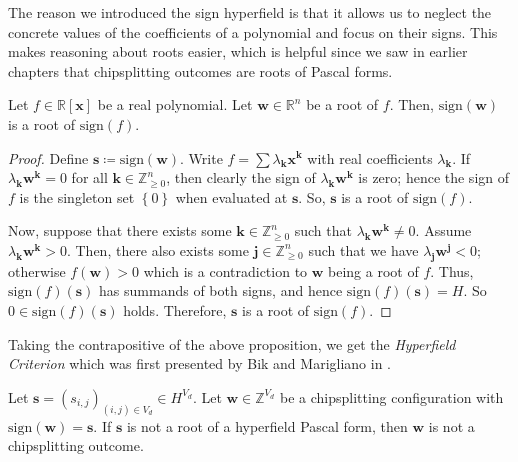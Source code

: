 The reason we introduced the sign hyperfield is that it allows us to neglect the concrete values of the coefficients of a polynomial and focus on their signs. This makes reasoning about roots easier, which is helpful since we saw in earlier chapters that chipsplitting outcomes are roots of Pascal forms.

\begin{proposition}\label{prop:sign-sikjsfnf}
    Let \( f \in \mathbb{R}[\mathbf{x}] \) be a real polynomial. Let \( \mathbf{w} \in \mathbb{R}^n \) be a root of \( f \). Then, \( \mathrm{sign}(\mathbf{w}) \) is a root of \( \mathrm{sign}(f) \).
\end{proposition}

\begin{proof}
    Define \( \mathbf{s} \coloneqq \mathrm{sign}(\mathbf{w}) \). Write \( f = \sum \lambda_{\mathbf{k}} \mathbf{x}^{\mathbf{k}} \) with real coefficients \( \lambda_{\mathbf{k}} \). If \( \lambda_{\mathbf{k}} \mathbf{w}^{\mathbf{k}} = 0 \) for all \( \mathbf{k} \in \mathbb{Z}^n_{\geq 0} \), then clearly the sign of \( \lambda_{\mathbf{k}} \mathbf{w}^{\mathbf{k}} \) is zero; hence the sign of \( f \) is the singleton set \( \left\{ 0 \right\} \) when evaluated at \( \mathbf{s} \). So, \( \mathbf{s} \) is a root of \( \mathrm{sign}(f) \).

    Now, suppose that there exists some \( \mathbf{k} \in \mathbb{Z}^n_{\geq 0} \) such that \( \lambda_{\mathbf{k}} \mathbf{w}^{\mathbf{k}} \neq 0 \). Assume \(  \lambda_{\mathbf{k}} \mathbf{w}^{\mathbf{k}} > 0 \). Then, there also exists some \( \mathbf{j} \in \mathbb{Z}^n_{\geq 0} \) such that we have \( \lambda_{\mathbf{j}} \mathbf{w}^{\mathbf{j}} < 0 \); otherwise \( f(\mathbf{w}) > 0 \) which is a contradiction to \( \mathbf{w} \) being a root of \( f \). Thus, \( \mathrm{sign}(f)(\mathbf{s}) \) has summands of both signs, and hence \( \mathrm{sign}(f)(\mathbf{s}) = H \). So \( 0 \in  \mathrm{sign}(f)(\mathbf{s}) \) holds. Therefore, \( \mathbf{s} \) is a root of \( \mathrm{sign}(f) \).
\end{proof}

Taking the contrapositive of the above proposition, we get the \emph{Hyperfield Criterion} which was first presented by Bik and Marigliano in \cite{bik2022classifying}.

\begin{proposition}\label{prop:hyperfield-criterion}
    Let \( \mathbf{s} = (s_{i,j})_{(i,j) \in V_d} \in H^{V_d} \). Let \( \mathbf{w} \in \mathbb{Z}^{V_d} \) be a chipsplitting configuration with \( \mathrm{sign}(\mathbf{w}) = \mathbf{s} \). If \( \mathbf{s} \) is not a root of a hyperfield Pascal form, then \( \mathbf{w} \) is not a chipsplitting outcome.
\end{proposition}

